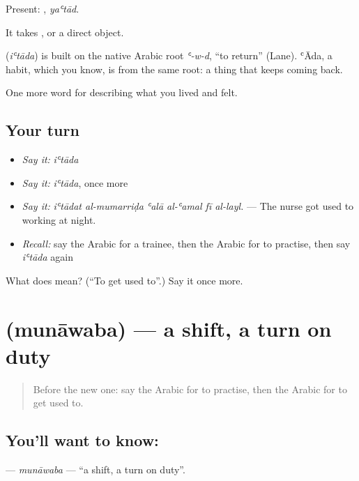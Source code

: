 Present: , \emph{yaʿtād}.

It takes , or a direct object.

\begin{cousinweb}
\textbf{} (\emph{iʿtāda}) is built on the native Arabic root \emph{ʿ-w-d}, \textquotedblleft{}to return\textquotedblright{} (Lane). ʿĀda, a habit, which you know, is from the same root: a thing that keeps coming back.
\end{cousinweb}

\begin{grammarlens}[title={What you've built}]
One more word for describing what you lived and felt.
\end{grammarlens}

\subsection*{Your turn}
\begin{itemize}
\raggedright
  \item \emph{Say it:} \emph{iʿtāda}
  \item \emph{Say it:} \emph{iʿtāda}, once more
  \item \emph{Say it:} \emph{iʿtādat al-mumarriḍa ʿalā al-ʿamal fī al-layl.} — The nurse got used to working at night.
  \item \emph{Recall:} say the Arabic for a trainee, then the Arabic for to practise, then say \emph{iʿtāda} again
\end{itemize}

\begin{tcolorbox}[breakable,colback=teal!4,colframe=teal!35!black,title={Before you move on}]
What does  mean? (\textquotedblleft{}To get used to\textquotedblright{}.) Say it once more.
\end{tcolorbox}
\section[\texorpdfstring{\ar{مناوبة} (munāwaba)}{مناوبة (munāwaba)}]{ (munāwaba) — a shift, a turn on duty}

\label{lesson:AR-C520-munawaba}



\begin{quote}
Before the new one: say the Arabic for to practise, then the Arabic for to get used to.
\end{quote}

\subsection*{You'll want to know: }
\textbf{} — \emph{munāwaba} — \textquotedblleft{}a shift, a turn on duty\textquotedblright{}.

